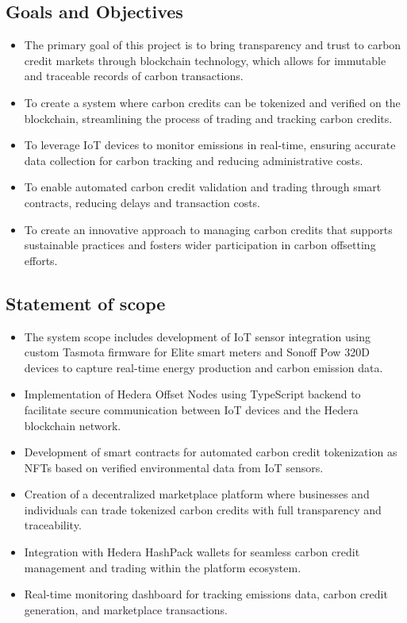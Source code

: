 \documentclass[oneside,a4paper,12pt]{book}
\begin{document}
\subsection{Goals and Objectives}  
\begin{itemize}
    \item The primary goal of this project is to bring transparency and trust to carbon credit markets through blockchain technology, which allows for immutable and traceable records of carbon transactions.
    \item To create a system where carbon credits can be tokenized and verified on the blockchain, streamlining the process of trading and tracking carbon credits.
    \item To leverage IoT devices to monitor emissions in real-time, ensuring accurate data collection for carbon tracking and reducing administrative costs.
    \item To enable automated carbon credit validation and trading through smart contracts, reducing delays and transaction costs.
    \item To create an innovative approach to managing carbon credits that supports sustainable practices and fosters wider participation in carbon offsetting efforts.
\end{itemize}

 \subsection{Statement of scope} 
	\begin{itemize}  
	\item The system scope includes development of IoT sensor integration using custom Tasmota firmware for Elite smart meters and Sonoff Pow 320D devices to capture real-time energy production and carbon emission data.
	\item Implementation of Hedera Offset Nodes using TypeScript backend to facilitate secure communication between IoT devices and the Hedera blockchain network.
	\item Development of smart contracts for automated carbon credit tokenization as NFTs based on verified environmental data from IoT sensors.
	\item Creation of a decentralized marketplace platform where businesses and individuals can trade tokenized carbon credits with full transparency and traceability.
	\item Integration with Hedera HashPack wallets for seamless carbon credit management and trading within the platform ecosystem.
	\item Real-time monitoring dashboard for tracking emissions data, carbon credit generation, and marketplace transactions.
	\end{itemize}
\end{document}
